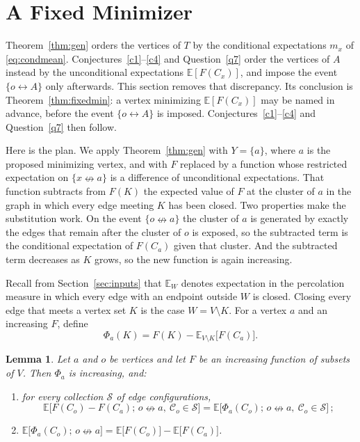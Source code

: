 \documentclass[11pt]{article}
\newtheorem{lemma}[theorem]{Lemma}
\theoremstyle{definition}
\theoremstyle{remark}
\newcommand{\EE}{\mathbb E}
\newcommand{\con}{\leftrightarrow}
\newcommand{\ncon}{\nleftrightarrow}
\newcommand{\eC}{\mathcal C}
\begin{document}
\section{A Fixed Minimizer}\label{sec:proj}

Theorem~\ref{thm:gen} orders the vertices of $T$ by the conditional expectations $m_x$ of
\eqref{eq:condmean}. Conjectures~\ref{c1}--\ref{c4} and Question~\ref{q7} order the
vertices of $A$ instead by the unconditional expectations $\EE[F(C_x)]$, and impose the
event $\{o\con A\}$ only afterwards. This section removes that discrepancy. Its conclusion
is Theorem~\ref{thm:fixedmin}: a vertex minimizing $\EE[F(C_x)]$ may be named in advance,
before the event $\{o\con A\}$ is imposed. Conjectures~\ref{c1}--\ref{c4} and
Question~\ref{q7} then follow.

Here is the plan. We apply Theorem~\ref{thm:gen} with $Y=\{a\}$, where $a$ is the proposed
minimizing vertex, and with $F$ replaced by a function whose restricted expectation on
$\{x\ncon a\}$ is a difference of unconditional expectations. That function subtracts from $F(K)$ the expected value of
$F$ at the cluster of $a$ in the graph in which every edge meeting $K$ has been closed. Two
properties make the substitution work. On the event $\{o\ncon a\}$ the cluster of $a$ is
generated by exactly the edges that remain after the cluster of $o$ is exposed, so the
subtracted term is the conditional expectation of $F(C_a)$ given that cluster. And the
subtracted term decreases as $K$ grows, so the new function is again increasing.

Recall from Section~\ref{sec:inputs} that $\EE_W$ denotes expectation in the percolation
measure in which every edge with an endpoint outside $W$ is closed. Closing every edge that
meets a vertex set $K$ is the case $W=V\setminus K$. For a vertex $a$ and an increasing
$F$, define
\[
 \Phi_a(K)=F(K)-\EE_{V\setminus K}\bigl[F(C_a)\bigr].
\]

\begin{lemma}\label{lem:proj}
Let $a$ and $o$ be vertices and let $F$ be an increasing function of subsets of $V$. Then
$\Phi_a$ is increasing, and:
\begin{enumerate}[label=\textup{(\roman*)}]
\item for every collection $\mathcal S$ of edge configurations,
\[
 \EE\bigl[F(C_o)-F(C_a);\,o\ncon a,\ \eC_o\in\mathcal S\bigr]
 =\EE\bigl[\Phi_a(C_o);\,o\ncon a,\ \eC_o\in\mathcal S\bigr]\,;
\]
\item $\EE\bigl[\Phi_a(C_o);\,o\ncon a\bigr]=\EE\bigl[F(C_o)\bigr]-\EE\bigl[F(C_a)\bigr]$.
\end{enumerate}
\end{lemma}
\end{document}
